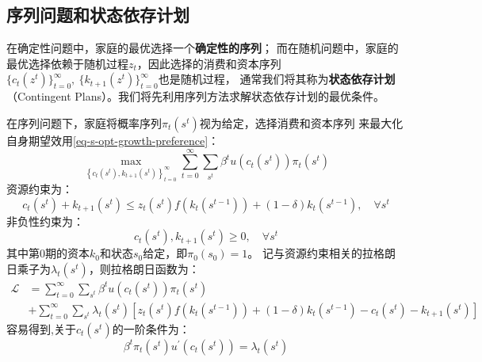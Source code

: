 \subsection{序列问题和状态依存计划}

在确定性问题中，家庭的最优选择一个\textbf{确定性的序列}；
而在随机问题中，家庭的最优选择依赖于随机过程$z_t$，因此选择的消费和资本序列
$\{c_t\left(z^t\right)\}_{t=0}^{\infty},~ \{k_{t+1}\left(z^t\right)\}_{t=0}^{\infty}$也是随机过程，
通常我们将其称为\textbf{状态依存计划}（Contingent Plans）。我们将先利用序列方法求解状态依存计划的最优条件。

在序列问题下，家庭将概率序列$\pi_t\left(s^t\right)$视为给定，选择消费和资本序列
来最大化自身期望效用\cref{eq-s-opt-growth-preference}：
\begin{equation*}
    \max _{\left\{c_t\left(s^t\right), k_{t+1}\left(s^t\right)\right\}_{t=0}^{\infty}} 
        \sum_{t=0}^{\infty} \sum_{s^t} \beta^t u\left(c_t\left(s^t\right)\right) \pi_t\left(s^t\right)
\end{equation*}
资源约束为：
\begin{equation}    \label{eq-s-opt-growth-rc}
    c_t\left(s^t\right)+k_{t+1}\left(s^t\right) \leq z_t\left(s^t\right) f\left(k_t\left(s^{t-1}\right)\right)
        + \left(1-\delta\right)k_t\left(s^{t-1}\right), \quad \forall s^t
\end{equation}
非负性约束为：
\begin{equation*}
    c_t\left(s^t\right), k_{t+1}\left(s^t\right) \geq 0, \quad \forall s^t
\end{equation*}
其中第0期的资本$k_0$和状态$s_0$给定，即$\pi_0\left(s_0\right)=1$。
记与资源约束相关的拉格朗日乘子为$\lambda_t\left(s^t\right)$，则拉格朗日函数为：
\begin{equation*}
    \begin{aligned}
        \mathcal{L} &=\sum_{t=0}^{\infty} \sum_{s^t} \beta^t u\left(c_t\left(s^t\right)\right) \pi_t\left(s^t\right) \\
            &+\sum_{t=0}^{\infty} \sum_{s^t} \lambda_t\left(s^t\right)
            \left[z_t\left(s^t\right)f\left(k_t\left(s^{t-1}\right)\right)+\left(1-\delta\right)k_t\left(s^{t-1}\right)
            -c_t\left(s^t\right)-k_{t+1}\left(s^t\right)\right]
    \end{aligned}
\end{equation*}
容易得到,关于$c_t\left(s^t\right)$的一阶条件为：
\begin{equation}    \label{eq-s-opt-growth-foc-c-sq}
    \beta^t \pi_t\left(s^t\right) u^{\prime}\left(c_t\left(s^t\right)\right)=\lambda_t\left(s^t\right)
\end{equation}

